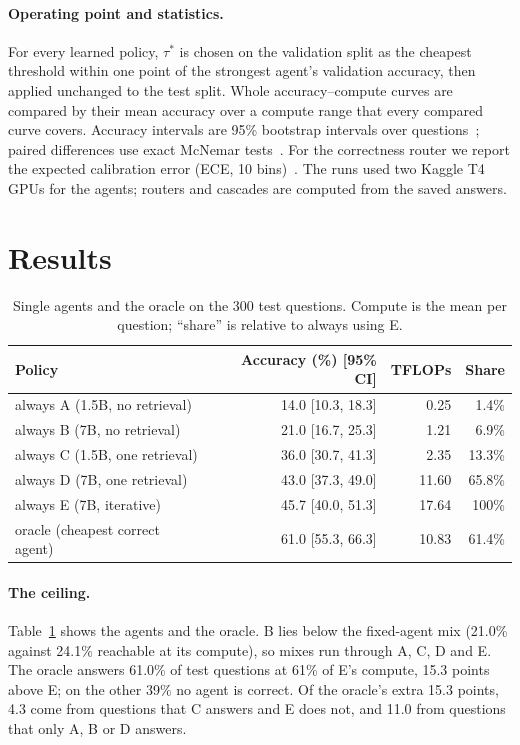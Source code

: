 \documentclass[11pt,a4paper]{article}
\begin{document}
\paragraph{Operating point and statistics.} For every learned policy, $\tau^*$ is chosen on the validation split as
the cheapest threshold within one point of the strongest agent's validation accuracy, then applied unchanged to the
test split. Whole accuracy--compute curves are compared by their mean accuracy over a compute range that every
compared curve covers. Accuracy intervals are 95\% bootstrap intervals over questions~\cite{efron1993bootstrap};
paired differences use exact McNemar tests~\cite{mcnemar1947}. For the correctness router we report the expected
calibration error (ECE, 10 bins)~\cite{guo2017calibration}. The runs used two Kaggle T4 GPUs for the agents; routers
and cascades are computed from the saved answers.

\section{Results}

\begin{table}[t]
\centering
\small
\caption{Single agents and the oracle on the 300 test questions. Compute is the mean per question; ``share'' is
relative to always using E.}
\label{tab:agents}
\begin{tabular}{lrrr}
\toprule
Policy & Accuracy (\%) [95\% CI] & TFLOPs & Share \\
\midrule
always A (1.5B, no retrieval) & 14.0 [10.3, 18.3] & 0.25 & 1.4\% \\
always B (7B, no retrieval) & 21.0 [16.7, 25.3] & 1.21 & 6.9\% \\
always C (1.5B, one retrieval) & 36.0 [30.7, 41.3] & 2.35 & 13.3\% \\
always D (7B, one retrieval) & 43.0 [37.3, 49.0] & 11.60 & 65.8\% \\
always E (7B, iterative) & 45.7 [40.0, 51.3] & 17.64 & 100\% \\
oracle (cheapest correct agent) & 61.0 [55.3, 66.3] & 10.83 & 61.4\% \\
\bottomrule
\end{tabular}
\end{table}

\paragraph{The ceiling.} Table~\ref{tab:agents} shows the agents and the oracle. B lies below the fixed-agent mix
(21.0\% against 24.1\% reachable at its compute), so mixes run through A, C, D and E. The oracle answers 61.0\% of
test questions at 61\% of E's compute, 15.3 points above E; on the other 39\% no agent is correct. Of the oracle's
extra 15.3 points, 4.3 come from questions that C answers and E does not, and 11.0 from questions that only A, B or D
answers.
\end{document}

